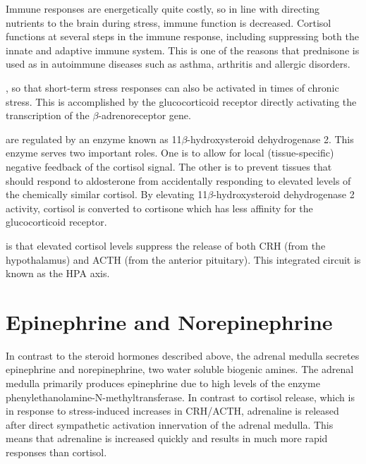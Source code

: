 \documentclass{tufte-handout}
\begin{document}
  Immune responses are energetically quite costly, so in line with directing nutrients to the brain during stress, immune function is decreased.  Cortisol functions at several steps in the immune response, including suppressing both the innate and adaptive immune system.  This is one of the reasons that prednisone is used as in autoimmune diseases such as asthma, arthritis and allergic disorders.

, so that short-term stress responses can also be activated in times of chronic stress.  This is accomplished by the glucocorticoid receptor directly activating the transcription of the $\beta$-adrenoreceptor gene\cite{Hadcock1988}.

 are regulated by an enzyme known as 11$\beta$-hydroxysteroid dehydrogenase 2.  This enzyme serves two important roles.  One is to allow for local (tissue-specific) negative feedback of the cortisol signal.  The other is to prevent tissues that should respond to aldosterone from accidentally responding to elevated levels of the chemically similar cortisol.  By elevating 11$\beta$-hydroxysteroid dehydrogenase 2 activity, cortisol is converted to cortisone which has less affinity for the glucocorticoid receptor.

 is that elevated cortisol levels suppress the release of both CRH (from the hypothalamus) and ACTH (from the anterior pituitary).  This integrated circuit is known as the HPA axis.  

\section{Epinephrine and Norepinephrine}

In contrast to the steroid hormones described above, the adrenal medulla secretes epinephrine and norepinephrine, two water soluble biogenic amines.  The adrenal medulla primarily produces epinephrine due to high levels of the enzyme phenylethanolamine-N-methyltransferase.  In contrast to cortisol release, which is in response to stress-induced increases in CRH/ACTH, adrenaline is released after direct sympathetic activation innervation of the adrenal medulla.  This means that adrenaline is increased quickly and results in much more rapid responses than cortisol.  
\end{document}
